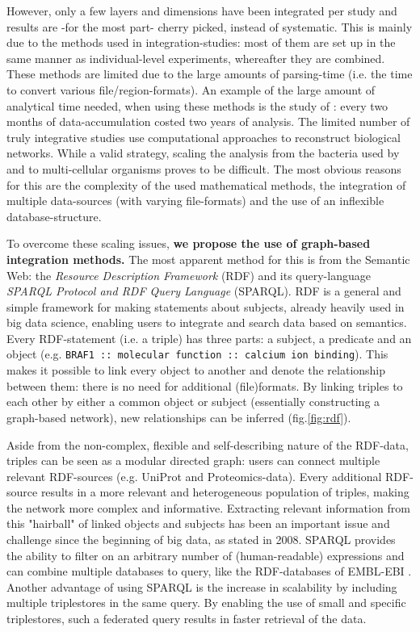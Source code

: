 \documentclass[twoside,fontsize=12pt]{article}
\begin{document}
However, only a few layers and dimensions have been integrated per study and results are -for the most part- cherry picked, instead of systematic. This is mainly due to the methods used in integration-studies: most of them are set up in the same manner as individual-level experiments, whereafter they are combined. These methods are limited due to the large amounts of parsing-time (i.e. the time to convert various file/region-formats). An example of the large amount of analytical time needed, when using these methods is the study of \citet{Munoz2011}: every two months of data-accumulation costed two years of analysis. The limited number of truly integrative studies use computational approaches to reconstruct biological networks. While a valid strategy, scaling the analysis from the bacteria used by \citet{Karr2012} and \citet{Lerman2012} to multi-cellular organisms proves to be difficult. The most obvious reasons for this are the complexity of the used mathematical methods, the integration of multiple data-sources (with varying file-formats) and the use of an inflexible database-structure.
\medskip

\noindent
To overcome these scaling issues, \textbf{we propose the use of graph-based integration methods.} The most apparent method for this is from the Semantic Web: the \textit{Resource Description Framework} (RDF) and its query-language \textit{SPARQL Protocol and RDF Query Language} (SPARQL). RDF is a general and simple framework for making statements about subjects, already heavily used in big data science, enabling users to integrate and search data based on semantics. Every RDF-statement (i.e. a triple) has three parts: a subject, a predicate and an object (e.g. \lstinline|BRAF1 :: molecular function :: calcium ion binding|). This makes it possible to link every object to another and denote the relationship between them: there is no need for additional (file)formats. By linking triples to each other by either a common object or subject (essentially constructing a graph-based network), new relationships can be inferred (fig.\ref{fig:rdf}). 

Aside from the non-complex, flexible and self-describing nature of the RDF-data, triples can be seen as a modular directed graph: users can connect multiple relevant RDF-sources (e.g. UniProt and Proteomics-data). Every additional RDF-source results in a more relevant and heterogeneous population of triples, making the network more complex and informative. Extracting relevant information from this "hairball" of linked objects and subjects has been an important issue and challenge since the beginning of big data, as \citet{Pavlopoulos2008} stated in 2008. SPARQL provides the ability to filter on an arbitrary number of (human-readable) expressions and can combine multiple databases to query, like the RDF-databases of EMBL-EBI \citep{Jupp2014}. Another advantage of using SPARQL is the increase in scalability by including multiple triplestores in the same query. By enabling the use of small and specific triplestores, such a federated query results in faster retrieval of the data.
\end{document}
